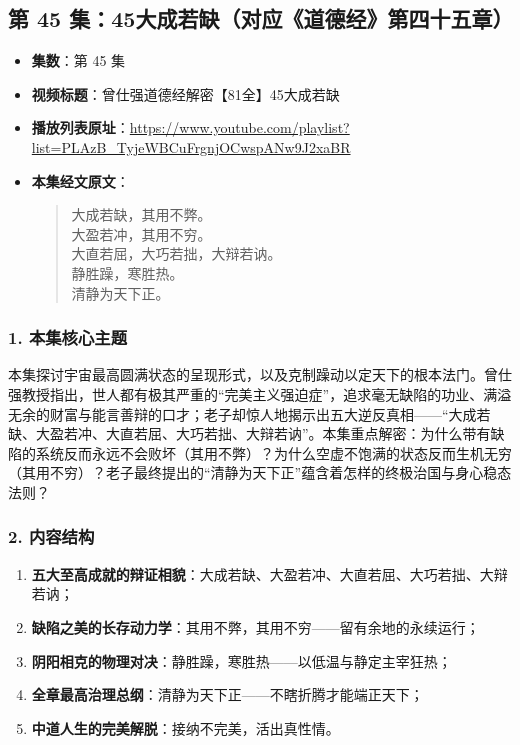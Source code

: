 \clearpage

\subsection{第 45 集：45大成若缺（对应《道德经》第四十五章）}
\label{sec:ep45}

\begin{itemize}
    \item \textbf{集数}：第 45 集
    \item \textbf{视频标题}：曾仕强道德经解密【81全】45大成若缺
    \item \textbf{播放列表原址}：\url{https://www.youtube.com/playlist?list=PLAzB_TyjeWBCuFrgnjOCwspANw9J2xaBR}
    \item \textbf{本集经文原文}：
    \begin{quote}\kaishu
    大成若缺，其用不弊。\\
    大盈若冲，其用不穷。\\
    大直若屈，大巧若拙，大辩若讷。\\
    静胜躁，寒胜热。\\
    清静为天下正。
    \end{quote}
\end{itemize}

\subsubsection{1. 本集核心主题}
本集探讨宇宙最高圆满状态的呈现形式，以及克制躁动以定天下的根本法门。曾仕强教授指出，世人都有极其严重的“完美主义强迫症”，追求毫无缺陷的功业、满溢无余的财富与能言善辩的口才；老子却惊人地揭示出五大逆反真相——“大成若缺、大盈若冲、大直若屈、大巧若拙、大辩若讷”。本集重点解密：为什么带有缺陷的系统反而永远不会败坏（其用不弊）？为什么空虚不饱满的状态反而生机无穷（其用不穷）？老子最终提出的“清静为天下正”蕴含着怎样的终极治国与身心稳态法则？

\subsubsection{2. 内容结构}
\begin{enumerate}
    \item \textbf{五大至高成就的辩证相貌}：大成若缺、大盈若冲、大直若屈、大巧若拙、大辩若讷；
    \item \textbf{缺陷之美的长存动力学}：其用不弊，其用不穷——留有余地的永续运行；
    \item \textbf{阴阳相克的物理对决}：静胜躁，寒胜热——以低温与静定主宰狂热；
    \item \textbf{全章最高治理总纲}：清静为天下正——不瞎折腾才能端正天下；
    \item \textbf{中道人生的完美解脱}：接纳不完美，活出真性情。
\end{enumerate}

